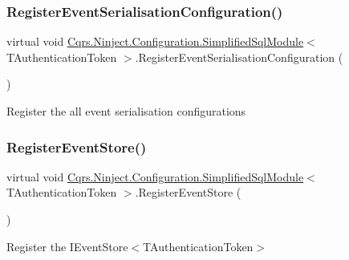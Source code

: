 \subsubsection{\texorpdfstring{Register\+Event\+Serialisation\+Configuration()}{RegisterEventSerialisationConfiguration()}}
{\footnotesize\ttfamily virtual void \hyperlink{classCqrs_1_1Ninject_1_1Configuration_1_1SimplifiedSqlModule}{Cqrs.\+Ninject.\+Configuration.\+Simplified\+Sql\+Module}$<$ T\+Authentication\+Token $>$.Register\+Event\+Serialisation\+Configuration (\begin{DoxyParamCaption}{ }\end{DoxyParamCaption})\hspace{0.3cm}{\ttfamily [virtual]}}



Register the all event serialisation configurations 

\mbox{\label{classCqrs_1_1Ninject_1_1Configuration_1_1SimplifiedSqlModule_a56dec199f21a562dd6e0c4e2961a1858_a56dec199f21a562dd6e0c4e2961a1858}} 
\subsubsection{\texorpdfstring{Register\+Event\+Store()}{RegisterEventStore()}}
{\footnotesize\ttfamily virtual void \hyperlink{classCqrs_1_1Ninject_1_1Configuration_1_1SimplifiedSqlModule}{Cqrs.\+Ninject.\+Configuration.\+Simplified\+Sql\+Module}$<$ T\+Authentication\+Token $>$.Register\+Event\+Store (\begin{DoxyParamCaption}{ }\end{DoxyParamCaption})\hspace{0.3cm}{\ttfamily [virtual]}}



Register the I\+Event\+Store$<$\+T\+Authentication\+Token$>$ 

